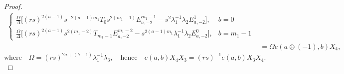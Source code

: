 \documentclass[10pt,a4paper]{amsart}
\begin{document}
\begin{proof}
\begin{align*}
\begin{cases}
\displaystyle\frac{\Omega}{\Delta} \Bigg[ 
            (rs)^{2(a-1)} s^{-2 (a-1) m_1} T_0  s^{2(m_1-1)} E^{m_1-1}_{a,-2}  
            - s^{2} \lambda_1^{-1} \lambda_2 E^{1}_{a,-2} 
        \Bigg],  
        &  b = 0 \\[13pt]
\displaystyle\frac{\Omega}{\Delta} \Bigg[ 
            (rs)^{2(a-1)} s^{2(m_1 - 2)} T_{m_1-1}
           E^{m_1-2}_{a,-2} - s^{2 (a-1) m_1} \lambda_1^{-1} \lambda_2 E^{0}_{a,-2}
        \Bigg],  
        & b = m_1 - 1
    \end{cases}\\[2pt]
    &=\Omega e(a\oplus(-1),b)X_4,\end{align*}
    $\text{where}\quad\Omega=(rs)^{2a+(b-1)}\lambda_1^{-1}\lambda_3,\quad \text{hence}\quad e(a,b)X_4X_3=(rs)^{-1}e(a,b)X_3X_4.$
\end{proof}
\end{document}
